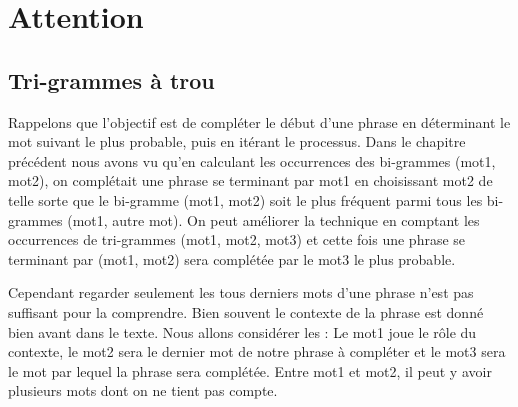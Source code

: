 \documentclass[11pt,class=report,crop=false]{standalone}
\begin{document}
\section{Attention}

\subsection{Tri-grammes à trou}

Rappelons que l'objectif est de compléter le début d'une phrase en déterminant le mot suivant le plus probable, puis en itérant le processus.
Dans le chapitre précédent nous avons vu qu'en calculant les occurrences des bi-grammes (mot1, mot2), on complétait une phrase se terminant par mot1 en choisissant mot2 de telle sorte que le bi-gramme (mot1, mot2) soit le plus fréquent parmi tous les bi-grammes (mot1, autre mot).
On peut améliorer la technique en comptant les occurrences de tri-grammes (mot1, mot2, mot3) et cette fois une phrase se terminant par (mot1, mot2) sera complétée par le mot3 le plus probable.

Cependant regarder seulement les tous derniers mots d'une phrase n'est pas suffisant pour la comprendre. Bien souvent le contexte de la phrase est donné bien avant dans le texte.
Nous allons considérer les  :
Le mot1 joue le rôle du contexte, le mot2 sera le dernier mot de notre phrase à compléter et le mot3 sera le mot par lequel la phrase sera complétée. Entre mot1 et mot2, il peut y avoir plusieurs mots dont on ne tient pas compte.
\end{document}
